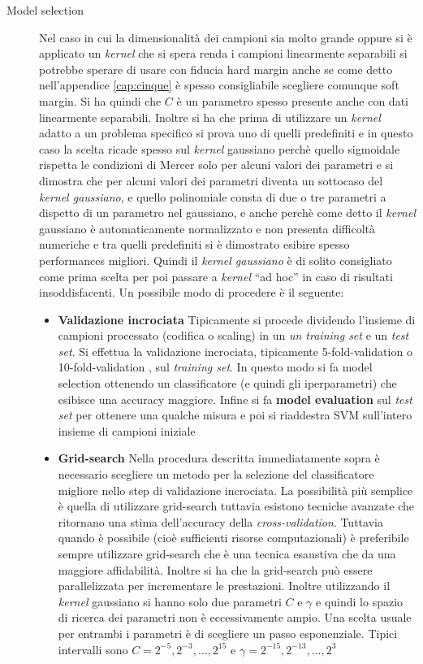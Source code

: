\begin{description}
\item[Model selection] Nel caso in cui la dimensionalità dei campioni sia molto grande oppure si è applicato un \textit{kernel} che si spera renda i campioni linearmente separabili si potrebbe sperare di usare con fiducia hard margin anche se come detto nell'appendice \ref{cap:cinque} è spesso consigliabile scegliere comunque soft margin. Si ha quindi che $C$ è un parametro spesso presente anche con dati linearmente separabili. Inoltre si ha che prima di utilizzare un \textit{kernel} adatto a un problema specifico si prova uno di quelli predefiniti e in questo caso la scelta ricade spesso sul \textit{kernel} gaussiano perchè quello sigmoidale  rispetta le condizioni di Mercer solo per alcuni valori dei parametri e si dimostra che per alcuni valori dei parametri diventa un sottocaso del \textit{kernel gaussiano}, e quello polinomiale consta di due o tre parametri a dispetto di un parametro nel gaussiano, e anche perchè come detto il \textit{kernel} gaussiano è automaticamente normalizzato e non presenta difficoltà numeriche e tra quelli predefiniti si è dimostrato esibire spesso performances migliori. Quindi il \textit{kernel gaussiano} è di solito consigliato come prima scelta per poi passare a \textit{kernel} ``ad hoc'' in caso di risultati insoddisfacenti. Un possibile modo di procedere è il seguente:
\begin{itemize}
\item \textbf{Validazione incrociata} Tipicamente si procede dividendo l'insieme di campioni processato (codifica o scaling)  in un \textit{un training set} e un \textit{test set}. Si effettua la validazione incrociata, tipicamente 5-fold-validation o 10-fold-validation , sul \textit{training set}. In questo modo si fa model selection ottenendo un classificatore (e quindi gli iperparametri) che esibisce una accuracy maggiore. Infine si fa \textbf{model evaluation} sul \textit{test set} per ottenere una qualche misura e poi si riaddestra \ac{SVM} sull'intero insieme di campioni iniziale  
\item \textbf{Grid-search} Nella procedura descritta immediatamente sopra è necessario scegliere un metodo per la selezione del classificatore migliore nello step di validazione incrociata. La possibilità più semplice è quella di utilizzare grid-search tuttavia esistono tecniche avanzate che ritornano una stima dell'accuracy della \textit{cross-validation}. Tuttavia quando è possibile (cioè sufficienti risorse computazionali) è preferibile sempre utilizzare grid-search che è una tecnica esaustiva che da una maggiore affidabilità. Inoltre si ha che la grid-search può essere parallelizzata per incrementare le prestazioni. Inoltre utilizzando il \textit{kernel} gaussiano si hanno solo due parametri  $C \text{ e } \gamma$ e quindi lo spazio di ricerca dei parametri non è eccessivamente ampio. Una scelta usuale per entrambi i parametri è di scegliere un passo esponenziale. Tipici intervalli sono $C = 2^{-5},2^{-3},\dots,2^{15}$  e $\gamma = 2^{-15},2^{-13},\dots,2^{3}$
\end{itemize}
\end{description}


